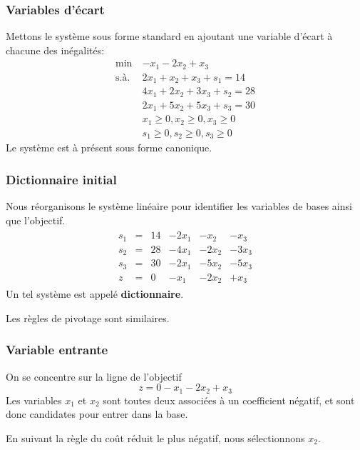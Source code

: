 \documentclass[usepdftitle=false]{beamer}
\begin{document}
\begin{frame}
\frametitle{Variables d'écart}

Mettons le système sous forme standard en ajoutant une variable d'écart à chacune des inégalités:
\begin{align*}
\min\ & - x_1 - 2x_2 + x_3 \\
\mbox{s.à. } & 2x_1 + x_2 + x_3 + s_1 = 14 \\
& 4x_1 + 2x_2 + 3x_3 + s_2 = 28 \\
& 2x_1 + 5x_2 + 5x_3 + s_3 = 30 \\
& x_1 \geq 0, x_2 \geq 0, x_3 \geq 0 \\
& s_1 \geq 0, s_2 \geq 0, s_3 \geq 0
\end{align*}
Le système est à présent sous forme canonique.

\end{frame}

\begin{frame}
\frametitle{Dictionnaire initial}

Nous réorganisons le système linéaire pour identifier les variables de bases ainsi que l'objectif.
\begin{align*}
\begin{array}{cccccc}
s_1 & = & 14 & - 2x_1 & - x_2 & - x_3 \\
s_2 & =	& 28 & - 4x_1 & - 2x_2 & - 3x_3 \\
s_3 & =	& 30 & - 2x_1 & - 5x_2 & - 5x_3 \\
z & = & 0 & - x_1 & - 2 x_2 & + x_3
\end{array}
\end{align*}
Un tel système est appelé {\bf dictionnaire}.

\mbox{}

Les règles de pivotage sont similaires.

\end{frame}

\begin{frame}
\frametitle{Variable entrante}

On se concentre sur la ligne de l'objectif
$$
z = 0 - x_1 - 2 x_2 + x_3
$$
Les variables $x_1$ et $x_2$ sont toutes deux associées à un coefficient négatif, et sont donc candidates pour entrer dans la base.

\mbox{}

En suivant la règle du coût réduit le plus négatif, nous sélectionnons $x_2$.

\end{frame}
\end{document}
